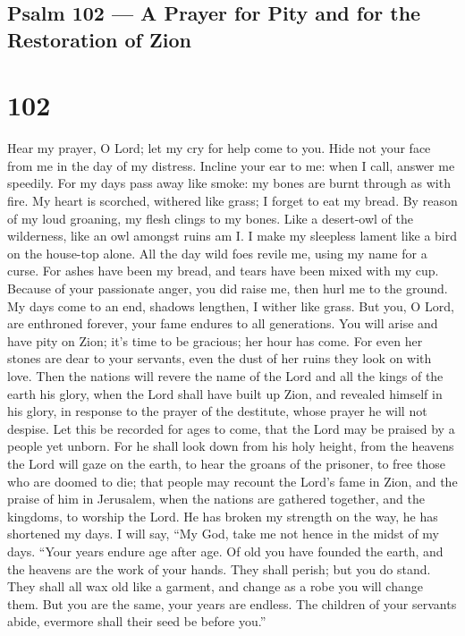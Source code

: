 \hypertarget{psalm-102-a-prayer-for-pity-and-for-the-restoration-of-zion}{%
\subsection{Psalm 102 --- A Prayer for Pity and for the Restoration of
Zion}\label{psalm-102-a-prayer-for-pity-and-for-the-restoration-of-zion}}

\hypertarget{section-101}{%
\section{102}\label{section-101}}

 Hear my prayer, O Lord; let my cry for help come to you.
 Hide not your face from me in the day of my distress.
Incline your ear to me: when I call, answer me speedily. 
For my days pass away like smoke: my bones are burnt through as with
fire.  My heart is scorched, withered like grass; I forget
to eat my bread.  By reason of my loud groaning, my flesh
clings to my bones.  Like a desert-owl of the wilderness,
like an owl amongst ruins am I.  I make my sleepless lament
like a bird on the house-top alone.  All the day wild foes
revile me, using my name for a curse.  For ashes have been
my bread, and tears have been mixed with my cup.  Because
of your passionate anger, you did raise me, then hurl me to the ground.
 My days come to an end, shadows lengthen, I wither like
grass.  But you, O Lord, are enthroned forever, your fame
endures to all generations.  You will arise and have pity
on Zion; it's time to be gracious; her hour has come.  For
even her stones are dear to your servants, even the dust of her ruins
they look on with love.  Then the nations will revere the
name of the Lord and all the kings of the earth his glory, 
when the Lord shall have built up Zion, and revealed himself in his
glory,  in response to the prayer of the destitute, whose
prayer he will not despise.  Let this be recorded for ages
to come, that the Lord may be praised by a people yet unborn.
 For he shall look down from his holy height, from the
heavens the Lord will gaze on the earth,  to hear the
groans of the prisoner, to free those who are doomed to die;
 that people may recount the Lord's fame in Zion, and the
praise of him in Jerusalem,  when the nations are gathered
together, and the kingdoms, to worship the Lord.  He has
broken my strength on the way, he has shortened my days.  I
will say, ``My God, take me not hence in the midst of my days. ``Your
years endure age after age.  Of old you have founded the
earth, and the heavens are the work of your hands.  They
shall perish; but you do stand. They shall all wax old like a garment,
and change as a robe you will change them.  But you are the
same, your years are endless.  The children of your
servants abide, evermore shall their seed be before you.''

